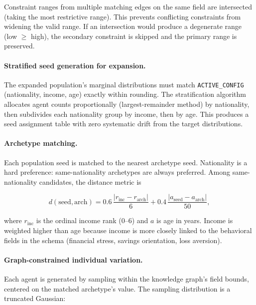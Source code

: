\documentclass[sustainability,article,submit,pdftex,moreauthors]{Definitions/mdpi}
\begin{document}
Constraint ranges from multiple matching edges on the same field are
intersected (taking the most restrictive range). This prevents conflicting
constraints from widening the valid range. If an intersection would produce
a degenerate range (low $\geq$ high), the secondary constraint is skipped
and the primary range is preserved.

\paragraph{Stratified seed generation for expansion.}
The expanded population's marginal distributions must match \texttt{ACTIVE\_CONFIG}
(nationality, income, age) exactly within rounding. The stratification
algorithm allocates agent counts proportionally (largest-remainder method)
by nationality, then subdivides each nationality group by income, then by
age. This produces a seed assignment table with zero systematic drift from
the target distributions.

\paragraph{Archetype matching.}
Each population seed is matched to the nearest archetype seed. Nationality
is a hard preference: same-nationality archetypes are always preferred.
Among same-nationality candidates, the distance metric is

\begin{linenomath}
\begin{equation}
  d(\text{seed}, \text{arch}) = 0.6\,\frac{|r_\text{inc} - r_\text{arch}|}{6}
                              + 0.4\,\frac{|a_\text{seed} - a_\text{arch}|}{50},
  \label{eq:match}
\end{equation}
\end{linenomath}

where $r_\text{inc}$ is the ordinal income rank (0--6) and $a$ is age in years.
Income is weighted higher than age because income is more closely linked to
the behavioral fields in the schema (financial stress, savings orientation,
loss aversion).

\paragraph{Graph-constrained individual variation.}
Each agent is generated by sampling within the knowledge graph's field bounds,
centered on the matched archetype's value. The sampling distribution is a
truncated Gaussian:
\end{document}

